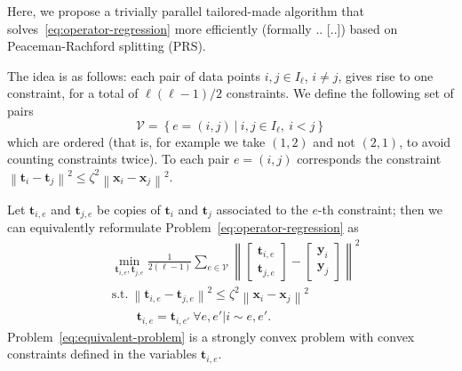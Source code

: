 \documentclass{article}
\newcommand{\norm}[1]{\left\lVert#1\right\rVert}
\newcommand{\tv}{\mathbold{t}}
\newcommand{\x}{\mathbold{x}}
\newcommand{\y}{\mathbold{y}}
\begin{document}
Here, we propose a trivially parallel tailored-made algorithm that solves~\eqref{eq:operator-regression} more efficiently (formally .. [..]) based on Peaceman-Rachford splitting (PRS).   

The idea is as follows: each pair of data points $i, j \in I_{\ell}$, $i \neq j$, gives rise to one constraint, for a total of $\ell(\ell-1)/2$ constraints. We define the following set of pairs
\begin{equation}
	\mathcal{V} = \left\{ e = (i,j) \ | \ i, j \in I_{\ell}, \ i < j \right\}
\end{equation}
which are ordered (that is, for example we take $(1,2)$ and not $(2,1)$, to avoid counting constraints twice). To each pair $e = (i,j)$ corresponds the constraint $\norm{\tv_i - \tv_j}^2 \leq \zeta^2 \norm{\x_i - \x_j}^2$.

Let $\tv_{i,e}$ and $\tv_{j,e}$ be copies of $\tv_i$ and $\tv_j$ associated to the $e$-th constraint; then we can equivalently reformulate Problem~\eqref{eq:operator-regression} as
\begin{subequations}\label{eq:equivalent-problem}
\begin{align}
	&\min_{\tv_{i,e}, \tv_{j,e}} \frac{1}{2 (\ell-1)} \sum_{e \in \mathcal{V}} \norm{\begin{bmatrix} \tv_{i,e} \\ \tv_{j,e} \end{bmatrix} - \begin{bmatrix} \y_i \\ \y_j \end{bmatrix}}^2 \\
	&\text{s.t.} \ \norm{\tv_{i,e} - \tv_{j,e}}^2 \leq \zeta^2 \norm{\x_i - \x_j}^2 \label{eq:interpolation-constraints} \\
	&\qquad \tv_{i,e} = \tv_{i,e'} \ \forall e, e' | i \sim e, e'. \label{eq:consensus-constraints}
\end{align}
\end{subequations}
Problem~\eqref{eq:equivalent-problem} is a strongly convex problem with convex constraints defined in the variables $\tv_{i,e}$.
\end{document}
